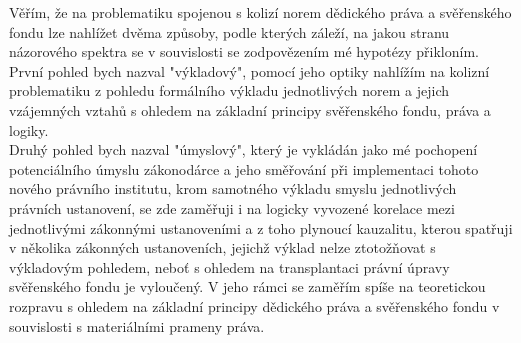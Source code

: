 \documentclass{article}
\begin{document}


Věřím, že na problematiku spojenou s kolizí norem dědického práva a svěřenského fondu lze nahlížet dvěma způsoby, podle kterých záleží, na jakou stranu názorového spektra se v souvislosti se zodpovězením mé hypotézy přikloním.\\

První pohled bych nazval "výkladový", pomocí jeho optiky nahlížím na kolizní problematiku z pohledu formálního výkladu jednotlivých norem a jejich vzájemných vztahů s ohledem na základní principy svěřenského fondu, práva a logiky.\\



Druhý pohled bych nazval "úmyslový", který je vykládán jako mé pochopení potenciálního úmyslu zákonodárce a jeho směřování při implementaci tohoto nového právního institutu, krom samotného výkladu smyslu jednotlivých právních ustanovení, se zde zaměřuji i na logicky vyvozené korelace mezi jednotlivými zákonnými ustanoveními a z toho plynoucí kauzalitu, kterou spatřuji v několika zákonných ustanoveních, jejichž výklad nelze ztotožňovat s výkladovým pohledem, neboť s ohledem na transplantaci právní úpravy svěřenského fondu je vyloučený. V jeho rámci se zaměřím spíše na teoretickou rozpravu s ohledem na základní principy dědického práva a svěřenského fondu v souvislosti s materiálními prameny práva.\\
\end{document}
